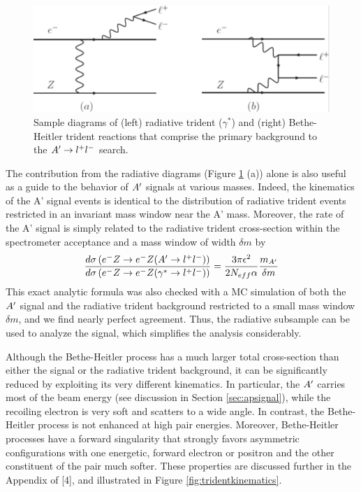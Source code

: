 \begin{figure}
\includegraphics[scale=1]{measurements/rad-bh-diagrams.pdf}
\caption{Sample diagrams of (left) radiative trident ($\gamma^*$) and (right) Bethe-Heitler trident reactions that comprise the primary background to the $A^\prime\rightarrow l^+l^-$  search.}
\label{fig:radbhdiagram}
\end{figure}

The contribution from the radiative diagrams (Figure \ref{fig:radbhdiagram} (a)) alone is also useful as a guide to the behavior of $A^\prime$ signals at various masses. Indeed, the kinematics of the A' signal events is identical to the distribution of radiative trident events restricted in an invariant mass window near the A' mass. Moreover, the rate of the A' signal is simply related to the radiative trident cross-section within the spectrometer acceptance and a mass window of width $\delta m$ by 
\begin{equation}
\frac{d\sigma\left(e^- Z \rightarrow e^- Z(A^\prime\rightarrow l^+l^-)\right)}{d\sigma\left(e^- Z \rightarrow e^- Z(\gamma^*\rightarrow l^+l^-)\right)}=\frac{3\pi\epsilon^2}{2 N_{eff}\alpha}\frac{m_{A^\prime}}{\delta m}
\end{equation}
This exact analytic formula was also checked with a MC simulation of both the $A^\prime$ signal and the radiative trident background restricted to a small mass window $\delta m$, and we find nearly perfect agreement. Thus, the radiative subsample can be used to analyze the signal, which simplifies the analysis considerably.

 Although the Bethe-Heitler process has a much larger total cross-section than either the signal or the radiative trident background, it can be significantly reduced by exploiting its very different kinematics. In particular, the $A^\prime$ carries most of the beam energy (see discussion in Section \ref{sec:apsignal}), while the recoiling electron is very soft and scatters to a wide angle. In contrast, the Bethe-Heitler process is not enhanced at high pair energies. Moreover, Bethe-Heitler processes have a forward singularity that strongly favors asymmetric configurations with one energetic, forward electron or positron and the other constituent of the pair much softer.
These properties are discussed further in the Appendix of [4], and illustrated in Figure \ref{fig:tridentkinematics}.

